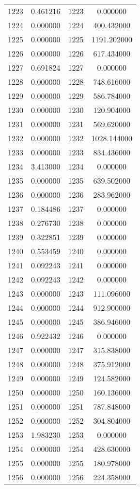 \documentclass[12pt]{article}
\begin{document}
\begin{longtable}{@{}cccc@{}}
1223 & 0.461216 & 1223 & 0.000000 \\
1224 & 0.000000 & 1224 & 400.432000 \\
1225 & 0.000000 & 1225 & 1191.202000 \\
1226 & 0.000000 & 1226 & 617.434000 \\
1227 & 0.691824 & 1227 & 0.000000 \\
1228 & 0.000000 & 1228 & 748.616000 \\
1229 & 0.000000 & 1229 & 586.784000 \\
1230 & 0.000000 & 1230 & 120.904000 \\
1231 & 0.000000 & 1231 & 569.620000 \\
1232 & 0.000000 & 1232 & 1028.144000 \\
1233 & 0.000000 & 1233 & 834.436000 \\
1234 & 3.413000 & 1234 & 0.000000 \\
1235 & 0.000000 & 1235 & 639.502000 \\
1236 & 0.000000 & 1236 & 283.962000 \\
1237 & 0.184486 & 1237 & 0.000000 \\
1238 & 0.276730 & 1238 & 0.000000 \\
1239 & 0.322851 & 1239 & 0.000000 \\
1240 & 0.553459 & 1240 & 0.000000 \\
1241 & 0.092243 & 1241 & 0.000000 \\
1242 & 0.092243 & 1242 & 0.000000 \\
1243 & 0.000000 & 1243 & 111.096000 \\
1244 & 0.000000 & 1244 & 912.900000 \\
1245 & 0.000000 & 1245 & 386.946000 \\
1246 & 0.922432 & 1246 & 0.000000 \\
1247 & 0.000000 & 1247 & 315.838000 \\
1248 & 0.000000 & 1248 & 375.912000 \\
1249 & 0.000000 & 1249 & 124.582000 \\
1250 & 0.000000 & 1250 & 160.136000 \\
1251 & 0.000000 & 1251 & 787.848000 \\
1252 & 0.000000 & 1252 & 304.804000 \\
1253 & 1.983230 & 1253 & 0.000000 \\
1254 & 0.000000 & 1254 & 428.630000 \\
1255 & 0.000000 & 1255 & 180.978000 \\
1256 & 0.000000 & 1256 & 224.358000 \\

\end{longtable}
\end{document}
